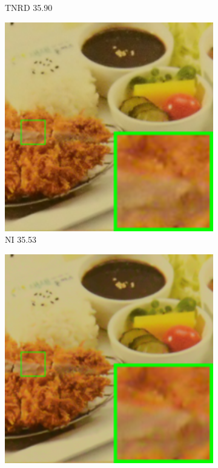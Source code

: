 \begin{figure}
\begin{subfigure}[t]{0.19\textwidth}
\caption{TNRD 35.90}
    \end{subfigure}
    \hfill
    \begin{subfigure}[t]{0.19\textwidth}
        \centering
        \includegraphics[width=1\textwidth]{images/mcwnnm/cc/resize_br_NI_CC15_d800_iso3200_2.png}
\caption{NI 35.53}
    \end{subfigure}
\hfill
    \begin{subfigure}[t]{0.19\textwidth}
        \centering
        \includegraphics[width=1\textwidth]{images/mcwnnm/cc/resize_br_NC_CC15_d800_iso3200_2.png}

\end{subfigure}
\end{figure}
